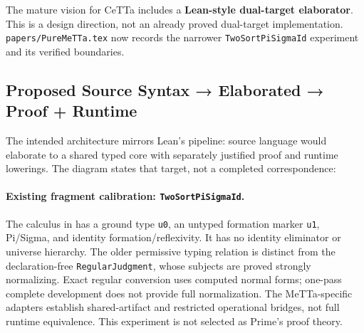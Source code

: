 \documentclass[11pt]{article}
\newcommand{\code}[1]{\texttt{#1}}
\newcommand{\CeTTa}{\textup{CeTTa}}
\begin{document}
The mature vision for \CeTTa{} includes a \textbf{Lean-style dual-target
elaborator}. This is a design direction, not an already proved dual-target
implementation. \code{papers/PureMeTTa.tex} now records the narrower
\code{TwoSortPiSigmaId} experiment and its verified boundaries.

\subsection{Proposed Source Syntax → Elaborated → Proof + Runtime}

The intended architecture mirrors Lean's pipeline: source language would
elaborate to a shared typed core with separately justified proof and runtime
lowerings. The diagram states that target, not a completed correspondence:

\begin{center}
\end{center}

\paragraph{Existing fragment calibration: \code{TwoSortPiSigmaId}.}
{\raggedright
The calculus in
 has a ground type
\code{u0}, an untyped formation marker \code{u1}, Pi/Sigma, and identity
formation/reflexivity. It has no identity eliminator or universe hierarchy.
The older permissive typing relation is distinct from the declaration-free
\code{RegularJudgment}, whose subjects are proved strongly normalizing.
Exact regular conversion uses computed normal forms; one-pass complete
development does not provide full normalization. The MeTTa-specific
 adapters
establish shared-artifact and restricted operational bridges, not full runtime
equivalence. This experiment is not selected as Prime's proof theory.
\par}
\end{document}
